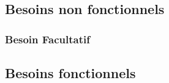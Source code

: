 \subsection{Besoins non fonctionnels}


\subsubsection{Besoin Facultatif}

\subsection{Besoins fonctionnels}